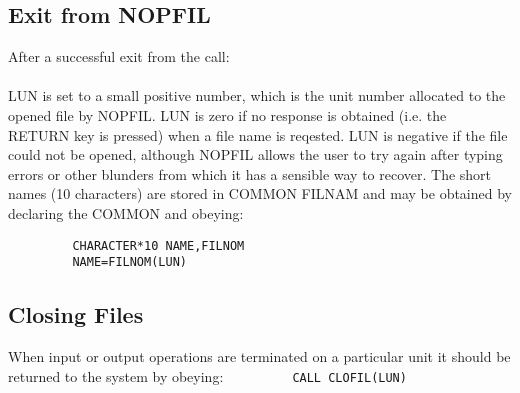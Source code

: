 \subsection{Exit from NOPFIL}
After a successful exit from the call:\\[0.2ex]
\\[0.2ex]
LUN is set to a small positive number, which is the
unit number allocated to the opened file by NOPFIL.  LUN is zero
if no response is obtained (i.e. the RETURN key is pressed) when a
file name is reqested. LUN is negative if the file could not be opened,
although NOPFIL allows the user to try again after typing errors or
other blunders from which it has a sensible way to recover.\p 
The short names (10 characters) are stored in COMMON FILNAM and
may be obtained by declaring the COMMON and obeying:
\\[0.2ex]
\begin{verbatim}         CHARACTER*10 NAME,FILNOM
         NAME=FILNOM(LUN)
\end{verbatim}
\subsection{Closing Files}
When input or output operations are terminated on a particular unit
it should be returned to the system by obeying:
\verb|         CALL CLOFIL(LUN)|
